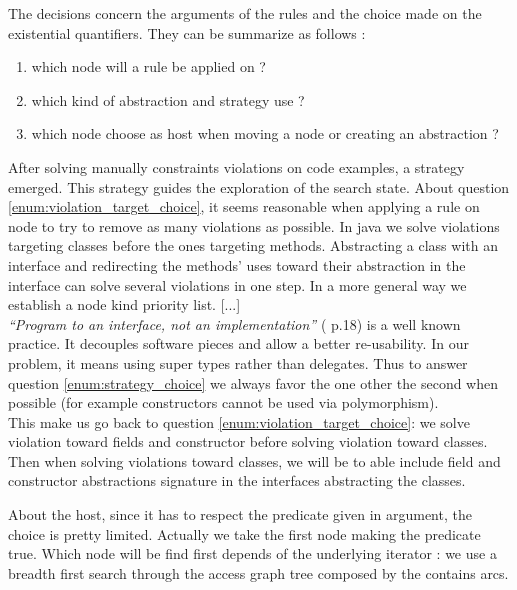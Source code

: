 \documentclass[]{article}
\begin{document}
\begin{framed}

The decisions concern the arguments of the rules and the choice made on the existential quantifiers. They can be summarize as follows :
\begin{enumerate}
\item \label{enum:violation_target_choice} which node will a rule be applied on ?
\item \label{enum:strategy_choice} which kind of abstraction and strategy use ?
\item \label{enum:host_choice} which node choose as host when moving a node or creating an abstraction ?
\end{enumerate}

After solving manually constraints violations on code examples, a strategy emerged. This strategy guides the exploration of the search state. About question \ref{enum:violation_target_choice}, it seems reasonable when applying a rule on node to try to remove as many violations as possible. In java we solve violations targeting classes before the ones targeting methods. Abstracting a class with an interface and redirecting the methods' uses toward their abstraction in the interface can solve several violations in one step. 
In a more general way we establish a node kind priority list.
[...]\\
\emph{``Program to an interface, not an implementation''} (\cite{gamma1993gof} p.18) is a well known practice. It decouples software pieces and allow a better re-usability. In our problem, it means using super types rather than delegates. Thus to answer question \ref{enum:strategy_choice} we always favor the one other the second when possible (for example constructors cannot be used via polymorphism). \\
This make us go back to question \ref{enum:violation_target_choice}: we solve violation toward fields and constructor before solving violation toward classes. Then when solving violations toward classes, we will be to able include field and constructor abstractions signature in the interfaces abstracting the classes.
\end{framed}

About the host, since it has to respect the predicate given in argument, the choice is pretty limited. Actually we take the first node making the predicate true. Which node will be find first depends of the underlying iterator : we use a breadth first search through the access graph tree composed by the contains arcs.
\end{document}
